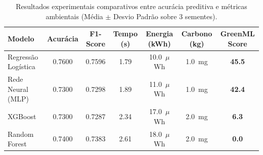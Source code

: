\begin{table}[htbp]
\centering
\small
\caption{Resultados experimentais comparativos entre acurácia preditiva e métricas ambientais (Média $\pm$ Desvio Padrão sobre 3 sementes).}
\label{tab:resultados_greenml}
\begin{tabular}{lcccccc}
\toprule
\textbf{Modelo} & \textbf{Acurácia} & \textbf{F1-Score} & \textbf{Tempo (s)} & \textbf{Energia (kWh)} & \textbf{Carbono (kg)} & \textbf{GreenML Score} \\
\midrule
Regressão Logística & 0.7600 & 0.7596 & 1.79 & 10.0~$\mu$Wh & 1.0~mg & \textbf{45.5} \\
Rede Neural (MLP) & 0.7300 & 0.7298 & 1.89 & 11.0~$\mu$Wh & 1.0~mg & \textbf{42.4} \\
XGBoost & 0.7300 & 0.7287 & 2.34 & 17.0~$\mu$Wh & 2.0~mg & \textbf{6.3} \\
Random Forest & 0.7400 & 0.7383 & 2.61 & 18.0~$\mu$Wh & 2.0~mg & \textbf{0.0} \\
\bottomrule
\end{tabular}
\end{table}
